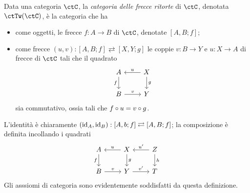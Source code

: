 \begin{definition}\label{def_cat_frecce_ritorte}
	Data una categoria \(\ctC\), la \emph{categoria delle frecce ritorte} di \(\ctC\), denotata \(\ctTw(\ctC)\), è la categoria che ha
	\begin{itemize}
		\item come oggetti, le frecce	\(f : A \to B\) di \(\ctC\), denotate \([A,B;f]\);
		\item come frecce \((u,v) : [A,B;f]\rightleftarrows [X,Y;g]\) le coppie \(v : B\to Y\) e \(u : X \to A\) di frecce di \(\ctC\) tali che il quadrato
		      \[
			      \begin{tikzcd}
				      A \ar{d}[swap]{f} & X \ar{l}[swap]{u} \ar{d}{g} \\
				      B  \ar{r}{v} & Y
			      \end{tikzcd}
		      \]
		      sia commutativo, ossia tali che \(f\circ u = v\circ g\).
	\end{itemize}
	L'identità è chiaramente \((\mathrm{id}_A,\mathrm{id}_B) : [A,b;f] \rightleftarrows [A,B;f]\); la composizione è definita incollando i quadrati
	\[
		\begin{tikzcd}
			A \ar{d}[swap]{f} & X \ar{l}[swap]{u} \ar{d}{g} & Z \ar{d}{h}\ar{l}[swap]{u'} \\
			B  \ar{r}{v} & Y \ar{r}{v'}& T
		\end{tikzcd}
	\]
	Gli asssiomi di categoria sono evidentemente soddisfatti da questa definizione.
\end{definition}
